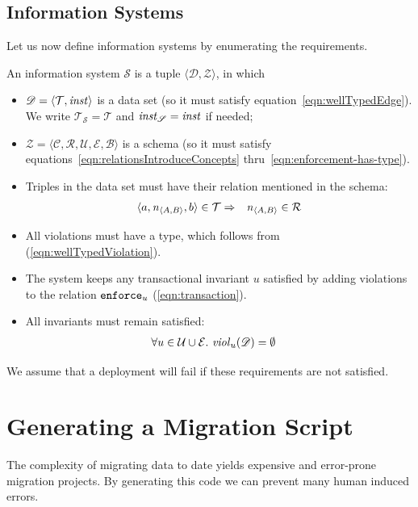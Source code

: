 \documentclass[runningheads]{llncs}
\newcommand{\id}[1]{\text{\it #1\/}}
\newcommand{\enforceC}[1]{{\tt enforce}_{#1}}
\newcommand{\instance}{\mathbin{\id{inst}}}
\newcommand{\viol}[2]{\violC{#1}(#2)}
\newcommand{\violC}[1]{\id{viol}_{#1}}
\newcommand{\declare}[3]{\id{#1}_{\pair{#2}{#3}}}
\newcommand{\pair}[2]{\langle{#1},{#2}\rangle}
\newcommand{\triple}[3]{\langle{#1},{#2},{#3}\rangle}
\newcommand{\quintuple}[5]{\langle{#1},{#2},{#3},{#4},{#5}\rangle}
\newcommand{\concepts}{\mathcal{C}}
\newcommand{\rels}{\mathcal{R}}   %
\newcommand{\triples}{\mathcal{T}}
\newcommand{\rules}{\mathcal{U}}
\newcommand{\transactions}{\mathcal{E}}
\newcommand{\busConstraints}{\mathcal{B}}
\newcommand{\dataset}{\mathscr{D}}
\newcommand{\schema}{\mathscr{Z}}
\newcommand{\infsys}{\mathscr{S}}
\begin{document}
\subsection{Information Systems}
\label{sct:Information Systems}
   Let us now define information systems by enumerating the requirements.
\begin{definition}
\label{def:information system}
\item An information system $\infsys$ is a tuple $\pair{\dataset}{\schema}$, in which
\begin{itemize}
\item $\dataset=\pair{\triples}{\instance}$ is a data set (so it must satisfy equation~\ref{eqn:wellTypedEdge}).
   We write $\triples_\infsys = \triples$ and $\instance_\infsys = \instance$ if needed;
\item $\schema=\quintuple{\concepts}{\rels}{\rules}{\transactions}{\busConstraints}$ is a schema (so it must satisfy equations~\ref{eqn:relationsIntroduceConcepts} thru~\ref{eqn:enforcement-has-type}).
\item Triples in the data set must have their relation mentioned in the schema:
   \begin{eqnarray}
      \triple{a}{\declare{n}{A}{B}}{b}\in\triples&\Rightarrow&\declare{n}{A}{B}\in\rels
   \label{eqn:define R}
   \end{eqnarray}
\item All violations must have a type, which follows from  (\ref{eqn:wellTypedViolation}).
\item The system keeps any transactional invariant $u$ satisfied by adding violations to the relation $\enforceC{u}$ (\ref{eqn:transaction}).
\item All invariants must remain satisfied:
   \begin{align}
      \forall u\in\rules\cup\transactions&.~\viol{u}{\dataset}=\emptyset
   \label{eqn:satisfaction}
   \end{align}
\end{itemize}
\end{definition}
   We assume that a deployment will fail if these requirements are not satisfied.

\section{Generating a Migration Script}
\label{sct:Generating}
   The complexity of migrating data to date yields expensive and error-prone migration projects.
   By generating this code we can prevent many human induced errors.
   
\end{document}
